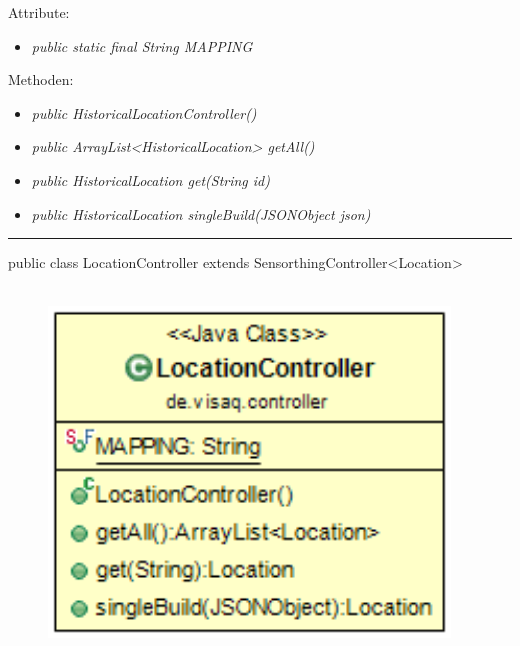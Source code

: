 Attribute:
\begin{itemize}
    \item \emph{public static final String MAPPING} \mappingDescription
\end{itemize}
Methoden:
\begin{itemize}
    \item \emph{public HistoricalLocationController()}
    \item \emph{public ArrayList<HistoricalLocation> getAll()}
    \extendsSensorthingController
    \item \emph{public HistoricalLocation get(String id)}
    \extendsSensorthingController
    \item \emph{public HistoricalLocation singleBuild(JSONObject json)}
    \extendsSensorthingController
\end{itemize}
\clearpage %
\rule{\textwidth}{0.4pt}
public class LocationController extends SensorthingController<Location>
\\\\
\begin{minipage}{0.3\textwidth}
    \begin{figure}[H]
        {\centering\includegraphics[width=0.95\textwidth]{media/backend/controller/classes/LocationController.png}}
    \end{figure}
    \end{minipage} \hfill
\begin{minipage}{0.7\textwidth}
\end{minipage}

